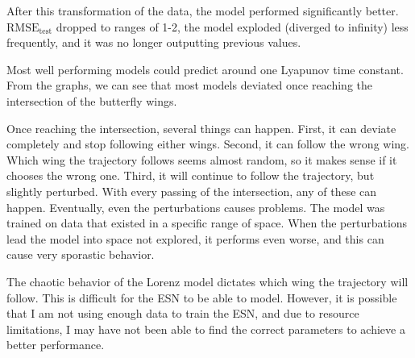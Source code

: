 \documentclass{article}
\begin{document}
After this transformation of the data, the model performed significantly
better. $\text{RMSE}_\text{test}$ dropped to ranges of 1-2, the model
exploded (diverged to infinity) less frequently, and it was no longer
outputting previous values.

Most well performing models could predict around one Lyapunov time constant. 
From the graphs, we can see that most models deviated once reaching the
intersection of the butterfly wings.

Once reaching the intersection, several things can happen. First, it can
deviate completely and stop following either wings. Second, it can follow the
wrong wing. Which wing the trajectory follows seems almost random, so it
makes sense if it chooses the wrong one. Third, it will continue to follow
the trajectory, but slightly perturbed. With every passing of the
intersection, any of these can happen. Eventually, even the perturbations
causes problems. The model was trained on data that existed in a specific
range of space. When the perturbations lead the model into space not
explored, it performs even worse, and this can cause very sporastic behavior.

The chaotic behavior of the Lorenz model dictates which wing the trajectory
will follow. This is difficult for the ESN to be able to model. However, it
is possible that I am not using enough data to train the ESN, and due to
resource limitations, I may have not been able to find the correct parameters
to achieve a better performance.
\end{document}
